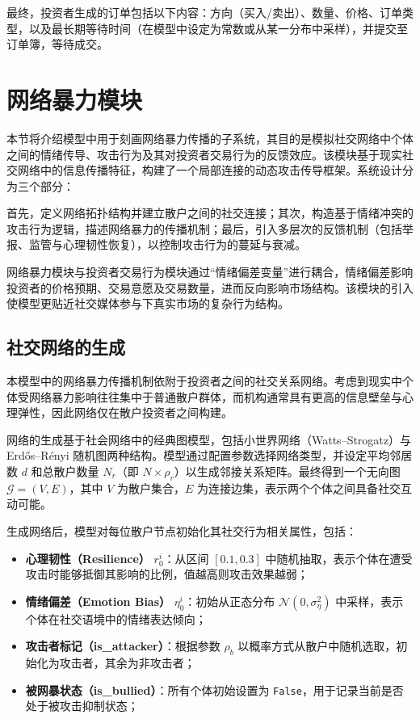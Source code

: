 最终，投资者生成的订单包括以下内容：方向（买入/卖出）、数量、价格、订单类型，以及最长期等待时间（在模型中设定为常数或从某一分布中采样），并提交至订单簿，等待成交。





\section{网络暴力模块}
\label{sec:3-4}

本节将介绍模型中用于刻画网络暴力传播的子系统，其目的是模拟社交网络中个体之间的情绪传导、攻击行为及其对投资者交易行为的反馈效应。该模块基于现实社交网络中的信息传播特征，构建了一个局部连接的动态攻击传导框架。系统设计分为三个部分：

首先，定义网络拓扑结构并建立散户之间的社交连接；其次，构造基于情绪冲突的攻击行为逻辑，描述网络暴力的传播机制；最后，引入多层次的反馈机制（包括举报、监管与心理韧性恢复），以控制攻击行为的蔓延与衰减。

网络暴力模块与投资者交易行为模块通过“情绪偏差变量”进行耦合，情绪偏差影响投资者的价格预期、交易意愿及交易数量，进而反向影响市场结构。该模块的引入使模型更贴近社交媒体参与下真实市场的复杂行为结构。




\subsection{社交网络的生成}

本模型中的网络暴力传播机制依附于投资者之间的社交关系网络。考虑到现实中个体受网络暴力影响往往集中于普通散户群体，而机构通常具有更高的信息壁垒与心理弹性，因此网络仅在散户投资者之间构建。

网络的生成基于社会网络中的经典图模型，包括小世界网络（Watts–Strogatz）与 Erdős–Rényi 随机图两种结构。模型通过配置参数选择网络类型，并设定平均邻居数 \( d \) 和总散户数量 \( N_r \)（即 \( N \times \rho_r \)）以生成邻接关系矩阵。最终得到一个无向图 \( \mathcal{G} = (V, E) \)，其中 \( V \) 为散户集合，\( E \) 为连接边集，表示两个个体之间具备社交互动可能。

生成网络后，模型对每位散户节点初始化其社交行为相关属性，包括：

\begin{itemize}
    \item \textbf{心理韧性（Resilience）} \( r_0^i \)：从区间 \([0.1, 0.3]\) 中随机抽取，表示个体在遭受攻击时能够抵御其影响的比例，值越高则攻击效果越弱；
    \item \textbf{情绪偏差（Emotion Bias）} \( \eta_0^i \)：初始从正态分布 \( \mathcal{N}(0, \sigma_\eta^2) \) 中采样，表示个体在社交语境中的情绪表达倾向；
    \item \textbf{攻击者标记（is\_attacker）}：根据参数 \( \rho_b \) 以概率方式从散户中随机选取，初始化为攻击者，其余为非攻击者；
    \item \textbf{被网暴状态（is\_bullied）}：所有个体初始设置为 \texttt{False}，用于记录当前是否处于被攻击抑制状态；
\end{itemize}

